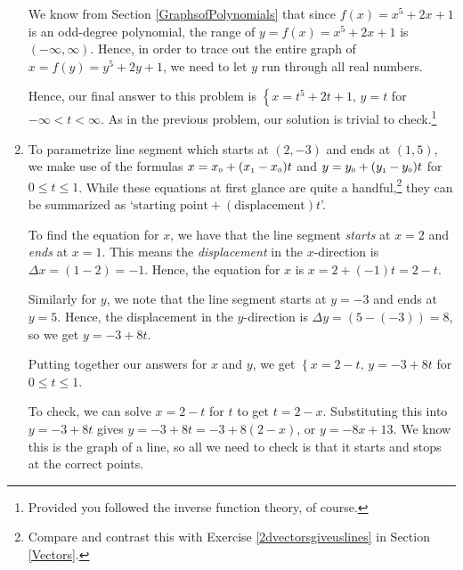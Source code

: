 \documentclass{ximera}
\begin{document}
\begin{ex}
\begin{enumerate}
\smallskip

We know from  Section \ref{GraphsofPolynomials} that since $f(x) = x^5 + 2x + 1$ is an odd-degree polynomial, the range of $y = f(x) = x^5 + 2x + 1$ is $(-\infty, \infty)$.  Hence, in order to trace out the entire graph of  $x = f(y) = y^5+2y+1$, we need to let $y$ run through all real numbers.  

\smallskip

Hence, our final answer to this problem is $\left\{ x = t^5+2t+1, \, y = t \right.$ for $-\infty < t < \infty$.  As in the previous problem, our solution is trivial to check.\footnote{Provided you followed the inverse function theory, of course.}

\item  To parametrize line segment which starts at $(2,-3)$ and ends at $(1,5)$, we make use of the formulas $x = x_{\text{\tiny$0$}} + (x_{\text{\tiny$1$}} - x_{\text{\tiny$0$}}) t$ and $y = y_{\text{\tiny$0$}} + (y_{\text{\tiny$1$}} - y_{\text{\tiny$0$}}) t$ for $0 \leq t \leq 1$.    While these equations at first glance are quite a handful,\footnote{Compare and contrast this with Exercise \ref{2dvectorsgiveuslines} in Section \ref{Vectors}.} they can be summarized as `$\text{starting point} + (\text{displacement})t$'.  

\smallskip

To find the equation for $x$, we have that the line segment \textit{starts} at $x= 2$ and \textit{ends} at $x = 1$.  This means the \textit{displacement} in the $x$-direction is $\Delta x = (1-2) = -1$.  Hence, the equation for $x$ is $x = 2 + (-1)t = 2-t$.  

\smallskip

Similarly for $y$, we note that the line segment starts at $y=-3$ and ends at $y=5$.  Hence, the displacement in the $y$-direction is $\Delta y = (5-(-3)) = 8$, so we get $y = -3+8t$. 
 
 \smallskip
 
Putting together our answers for $x$ and $y$, we get   $\left\{ x = 2-t, \, y = -3+8t \right.$ for $0 \leq t \leq 1$. 
  
  \smallskip
  
   To check, we can solve $x = 2-t$ for $t$ to get $t = 2-x$.  Substituting this into $y = -3+8t$ gives $y = -3+8t = -3+8(2-x)$, or $y = -8x+13$.  We know this is the graph of a line, so all we need to check is that it starts and stops at the correct points.  
   
   \smallskip
   

\end{enumerate}
\end{ex}
\end{document}
